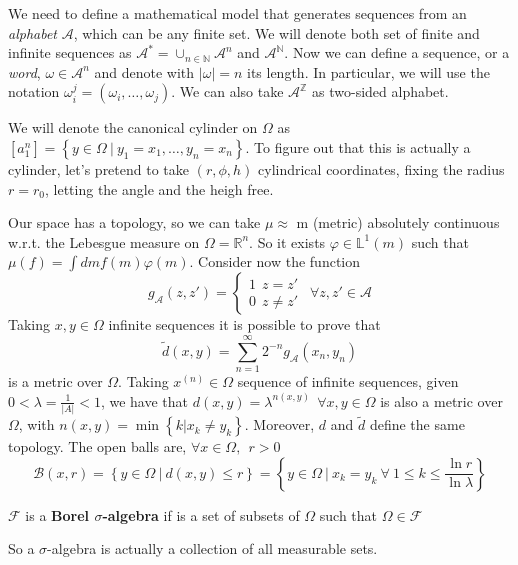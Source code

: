 We need to define a mathematical model that generates sequences from an \emph{alphabet} $\mathcal{A}$, which can be any finite set.
We will denote both set of finite and infinite sequences as $\mathcal{A}^{*} = \cup_{n \in \mathbb{N}} \mathcal{A}^n$ and $\mathcal{A}^\mathbb{N}$.
Now we can define a sequence, or a \emph{word}, $\omega \in \mathcal{A}^n$ and denote with $\left\lvert \omega \right\rvert = n$ its length.
In particular, we will use the notation $\omega_i^j = \left(\omega_i, \ldots, \omega_j\right)$.
We can also take $\mathcal{A}^\mathbb{Z}$ as two-sided alphabet.

We will denote the canonical cylinder on $\Omega$ as $\left[a_1^n\right] = \left\{y \in \Omega \ \vert \ y_1 = x_1, \ldots, y_n = x_n\right\}$.
To figure out that this is actually a cylinder, let's pretend to take $\left(r, \phi, h\right)$ cylindrical coordinates, fixing the radius $r = r_0$, letting the angle and the heigh free.

Our space has a topology, so we can take $\mu \approx$ m (metric) absolutely continuous w.r.t. the Lebesgue measure on $\Omega = \mathbb{R}^n$.
So it exists $\varphi \in \mathbb{L}^1(m)$ such that $\mu(f) = \int dm f(m)\varphi(m)$.
Consider now the function
\begin{equation*}
    g_\mathcal{A}\left(z, z'\right) =
    \begin{cases}
        1 \ \ z = z' \\
        0 \ \ z \neq z'
    \end{cases}
    \ \ \forall z, z' \in \mathcal{A}
\end{equation*}
Taking $x, y \in \Omega$ infinite sequences it is possible to prove that
\begin{equation*}
    \widetilde{d}\left(x, y\right) = \sum_{n=1}^\infty 2^{-n} g_\mathcal{A}\left(x_n, y_n\right)
\end{equation*}
is a metric over $\Omega$.
Taking $x^{(n)} \in \Omega$ sequence of infinite sequences, given $0 < \lambda = \frac{1}{\left\lvert A\right\rvert} < 1$, we have that $d(x, y) = \lambda^{n\left(x, y\right)} \ \ \forall x, y \in \Omega$ is also a metric over $\Omega$, with $n(x, y) = \min\left\{k \vert x_k \neq y_k\right\}$.
Moreover, $d$ and $\widetilde{d}$ define the same topology.
The open balls are, $\forall x \in \Omega, \ \ r > 0$
\begin{equation*}
    \mathcal{B}\left(x, r\right) =  \left\{y \in \Omega \ \vert \ d(x, y) \leq r\right\} = \left\{y \in \Omega \ \vert \ x_k = y_k \ \forall \ 1 \leq k \leq \frac{\ln r}{\ln \lambda}\right\}
\end{equation*}
\begin{definition}
    $\mathcal{F}$ is a \textbf{Borel $\sigma$-algebra} if is a set of subsets of $\Omega$ such that $\Omega \in \mathcal{F}$
\end{definition}
So a $\sigma$-algebra is actually a collection of all measurable sets.